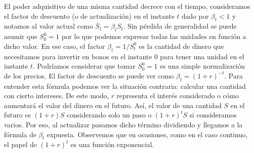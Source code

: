 El poder adquisitivo de una misma cantidad decrece con el tiempo, consideramos el factor de descuento (o de actualización) en el instante $ t $ dado por $ \beta_t < 1 $ y notamos al valor actual como $ \bar{S}_t = \beta_t S_t $. Sin pérdida de generalidad se puede asumir que $ S^0_0 = 1 $ por lo que podemos expresar todas las unidades en función a dicho valor. En ese caso, el factor $ \beta_t = 1/S^0_t $ es la cantidad de dinero que necesitamos para invertir en bonos en el instante 0 para tener una unidad en el instante $ t $. Podríamos considerar que tomar $ S^0_0 = 1 $  es una simple normalización de los precios. El factor de descuento se puede ver como $ \beta_t = (1+r)^{-t} $. Para entender esta fórmula podemos ver la situación contraria: calcular una cantidad con cierto intereses. De este modo, $ r $ representa el interés considerado o cómo aumentará el valor del dinero en el futuro. Así, el valor de una cantidad $ S $ en el futuro es $ (1+r)S $ considerando solo un paso o $ (1+r)^t S $ si consideramos varios. Por eso, al actualizar pasamos dicho término dividiendo y llegamos a la fórmula de $ \beta_t $ expuesta. Observemos que en ocasiones, como en el caso continuo, el papel de $ (1+r)^t $ es una función exponencial.\\

